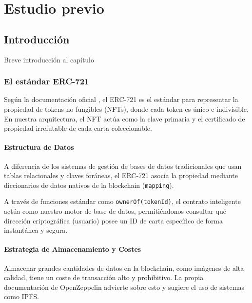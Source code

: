

\chapter{Estudio previo}\label{cap:planificación}

\section{Introducción}
Breve introducción al capítulo

\subsection{El estándar ERC-721}
Según la documentación oficial \cite{openzeppelin_erc721}, el ERC-721 es el estándar para representar 
la propiedad de tokens no fungibles (NFTs), donde cada token es único e indivisible. En nuestra arquitectura, 
el NFT actúa como la clave primaria y el certificado de propiedad irrefutable de cada carta coleccionable.

\subsubsection{Estructura de Datos}
A diferencia de los sistemas de gestión de bases de datos tradicionales que usan tablas relacionales y claves foráneas, el ERC-721 asocia 
la propiedad mediante diccionarios de datos nativos de la blockchain (\verb|mapping|).

A través de funciones estándar como \verb|ownerOf(tokenId)|, el contrato inteligente actúa como nuestro motor 
de base de datos, permitiéndonos consultar qué dirección criptográfica (usuario) posee un ID de carta 
específico de forma instantánea y segura.

\subsubsection{Estrategia de Almacenamiento y Costes}
Almacenar grandes cantidades de datos en la blockchain, como imágenes de alta calidad, tiene un coste de 
transacción alto y prohibitivo. La propia documentación de OpenZeppelin advierte sobre esto y sugiere el uso 
de sistemas como IPFS.

